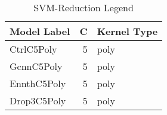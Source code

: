 \begin{table}
\centering
\caption{SVM-Reduction Legend}
\label{tab:SVM-Reduction_legend}
\begin{tabular}{lrl}
\toprule
Model Label & C & Kernel Type \\
\midrule
CtrlC5Poly & 5 & poly \\
GcnnC5Poly & 5 & poly \\
EnnthC5Poly & 5 & poly \\
Drop3C5Poly & 5 & poly \\
\bottomrule
\end{tabular}
\end{table}
